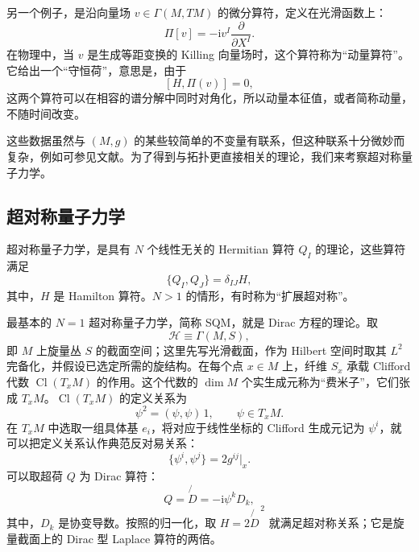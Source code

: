 \begin{example*}
另一个例子，是沿向量场 $v\in\Gamma(M,TM)$ 的微分算符，定义在光滑函数上：
\[
\Pi[v]=-\mathrm{i}v^I\frac{\partial}{\partial X^I}.
\]
在物理中，当 $v$ 是生成等距变换的 Killing 向量场时，这个算符称为“动量算符”。它给出一个“守恒荷”，意思是，由于
\[
[H,\Pi(v)]=0,
\]
这两个算符可以在相容的谱分解中同时对角化，所以动量本征值，或者简称动量，不随时间改变。
\end{example*}

这些数据虽然与 $(M,g)$ 的某些较简单的不变量有联系，但这种联系十分微妙而复杂，例如可参见文献。为了得到与拓扑更直接相关的理论，我们来考察超对称量子力学。

\subsection{超对称量子力学}\label{sec:3.1.1}

\begin{definition*}\label{def:3.supersymmetric-qm}
超对称量子力学，是具有 $N$ 个线性无关的 Hermitian 算符 $Q_I$ 的理论，这些算符满足
\begin{equation}\label{eq:3.3}
\{Q_I,Q_J\}=\delta_{IJ}H,
\end{equation}
其中，$H$ 是 Hamilton 算符。$N>1$ 的情形，有时称为“扩展超对称”。
\end{definition*}

最基本的 $N=1$ 超对称量子力学，简称 SQM，就是 Dirac 方程的理论。取
\begin{equation}\label{eq:3.4}
\mathcal{H}\equiv\Gamma(M,S),
\end{equation}
即 $M$ 上旋量丛 $S$ 的截面空间；这里先写光滑截面，作为 Hilbert 空间时取其 $L^2$ 完备化，并假设已选定所需的旋结构。在每个点 $x\in M$ 上，纤维 $S_x$ 承载 Clifford 代数 $\operatorname{Cl}(T_xM)$ 的作用。这个代数的 $\dim M$ 个实生成元称为“费米子”，它们张成 $T_xM$。$\operatorname{Cl}(T_xM)$ 的定义关系为
\[
\psi^2=(\psi,\psi)\,1,\qquad\psi\in T_xM.
\]
在 $T_xM$ 中选取一组具体基 $e_i$，将对应于线性坐标的 Clifford 生成元记为 $\psi^i$，就可以把定义关系认作典范反对易关系：
\begin{equation}\label{eq:3.5}
\{\psi^i,\psi^j\}=2g^{ij}|_x.
\end{equation}
可以取超荷 $Q$ 为 Dirac 算符：
\[
Q=\not{D}=-\mathrm{i}\psi^kD_k,
\]
其中，$D_k$ 是协变导数。按照的归一化，取 $H=2\not{D}^{\,2}$ 就满足超对称关系；它是旋量截面上的 Dirac 型 Laplace 算符的两倍。

